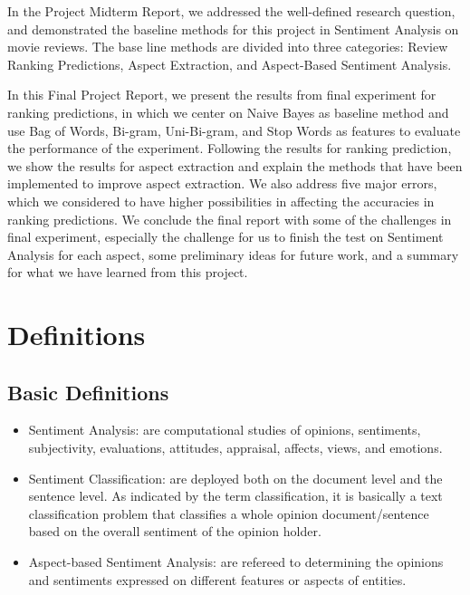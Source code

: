 \documentclass[12pt]{article}
\begin{document}
In the Project Midterm Report, we addressed the well-defined research question, and demonstrated the baseline methods for this project in Sentiment Analysis on movie reviews. The base line methods are divided into three categories: Review Ranking Predictions, Aspect Extraction, and Aspect-Based Sentiment Analysis. 

In this Final Project Report, we present the results from final experiment for ranking predictions, in which we center on Naive Bayes as baseline method and use Bag of Words, Bi-gram, Uni-Bi-gram, and Stop Words as features to evaluate the performance of the experiment. Following the results for ranking prediction, we show the results for aspect extraction and explain the methods that have been implemented to improve aspect extraction. We also address five major errors, which we considered to have higher possibilities in affecting the accuracies in ranking predictions. We conclude the final report with some of the challenges in final experiment, especially the challenge for us to finish the test on Sentiment Analysis for each aspect, some preliminary ideas for future work, and a summary for what we have learned from this project. 
 
\section{Definitions}
\subsection{Basic Definitions}
\begin{itemize}
\item Sentiment Analysis: are computational studies of opinions, sentiments, subjectivity, evaluations, attitudes, appraisal, affects, views, and emotions.
\item Sentiment Classification: are deployed both on the document level and the sentence level. As indicated by the term classification, it is basically a text classification problem that classifies a whole opinion document/sentence based on the overall sentiment of the opinion holder.
\item Aspect-based Sentiment Analysis: are refereed to determining the opinions and sentiments expressed on different features or aspects of entities.
\end{itemize}
\end{document}
